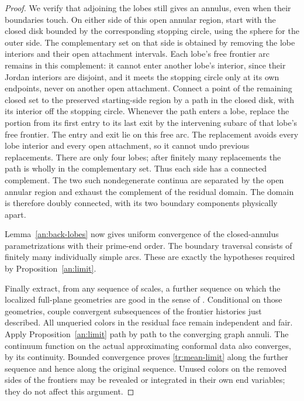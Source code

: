\begin{proof}
We verify that adjoining the lobes still gives an annulus, even when
their boundaries touch.  On either side of this open annular region,
start with the closed disk bounded by the corresponding stopping circle,
using the sphere for the outer side.  The complementary set on that
side is obtained by removing the lobe interiors and their open
attachment intervals.  Each lobe's free frontier arc remains in this
complement: it cannot enter another lobe's interior, since their Jordan
interiors are disjoint, and it meets the stopping circle only at its
own endpoints, never on another open attachment.  Connect a point of
the remaining closed set to the preserved starting-side region by a
path in the closed disk, with its interior off the stopping circle.
Whenever the path enters a lobe, replace the portion from its first
entry to its last exit by the intervening subarc of that lobe's free
frontier.  The entry and exit lie on this free arc.  The replacement
avoids every lobe interior and every open attachment, so it cannot
undo previous replacements.  There are only four lobes; after finitely
many replacements the path is wholly in the complementary set.
Thus each side has a connected complement.  The two such nondegenerate
continua are separated by the open annular region and exhaust the
complement of the residual domain.  The domain is therefore doubly
connected, with its two boundary components physically apart.

Lemma~\ref{an:back-lobes} now gives uniform convergence
of the closed-annulus parametrizations with their prime-end order.
The boundary traversal consists of finitely many individually simple
arcs.  These are exactly the hypotheses required by
Proposition~\ref{an:limit}.

Finally extract, from any sequence of scales, a further sequence on
which the localized full-plane geometries are good in the sense of
\cite[Section~2]{V}.  Conditional on those geometries, couple convergent
subsequences of the frontier histories just described.  All unqueried
colors in the residual face remain independent and fair.  Apply
Proposition~\ref{an:limit} path by path to the converging graph annuli.
The continuum function on the actual approximating conformal data
also converges, by its continuity.  Bounded convergence proves
\eqref{tr:mean-limit} along the further sequence and hence along the
original sequence.  Unused colors on the removed sides of the
frontiers may be revealed or integrated in their own end variables;
they do not affect this argument.
\end{proof}

